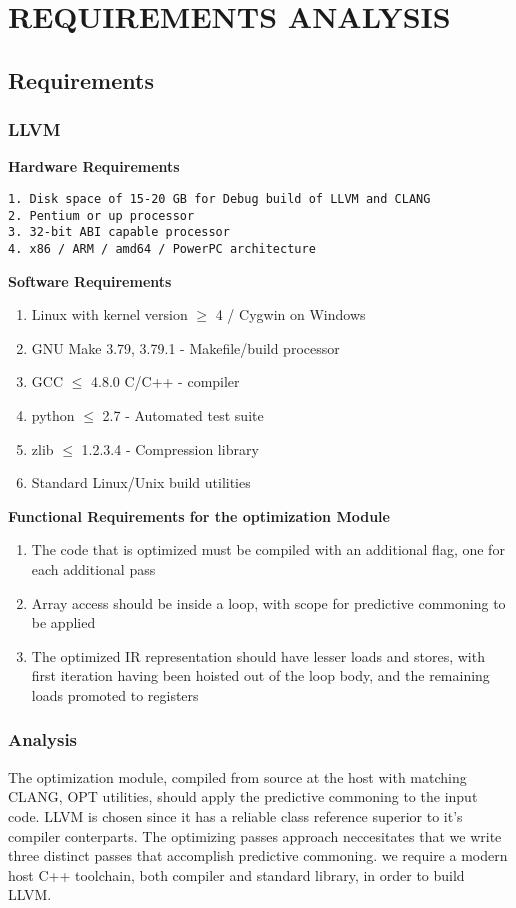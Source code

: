 
\chapter{REQUIREMENTS ANALYSIS} %

\section{Requirements}
\subsection{LLVM}
\textbf{Hardware Requirements}
\begin{verbatim}
1. Disk space of 15-20 GB for Debug build of LLVM and CLANG
2. Pentium or up processor
3. 32-bit ABI capable processor
4. x86 / ARM / amd64 / PowerPC architecture
\end{verbatim}
\textbf{Software Requirements}
\begin{enumerate}
\item Linux with kernel version $\ge$ 4 / Cygwin on Windows
\item GNU Make	3.79, 3.79.1 - Makefile/build processor
\item GCC	$\le$ 4.8.0	C/C++ -  compiler
\item python $\le$	2.7 -	Automated test suite
\item zlib	$\le$ 1.2.3.4 -	Compression library 
\item Standard Linux/Unix build utilities
\end{enumerate}

\pagebreak

\textbf{Functional Requirements for the optimization Module}
\\
\begin{enumerate}
\item The code that is optimized must be compiled with an additional flag, one for each additional pass
\item Array access should be inside a loop, with scope for predictive commoning to be applied
\item The optimized IR representation should have lesser loads and stores, with first iteration having been hoisted out of the loop body, and the remaining loads promoted to registers
\end{enumerate}
\subsection{Analysis}

The optimization module, compiled from source at the host with matching CLANG, OPT utilities, should apply the predictive commoning to the input code. LLVM is chosen since it has a reliable class reference superior to it's compiler conterparts. The optimizing passes approach neccesitates that we write three distinct passes that accomplish predictive commoning.  we require a modern host C++ toolchain, both compiler and standard library, in order to build LLVM.

